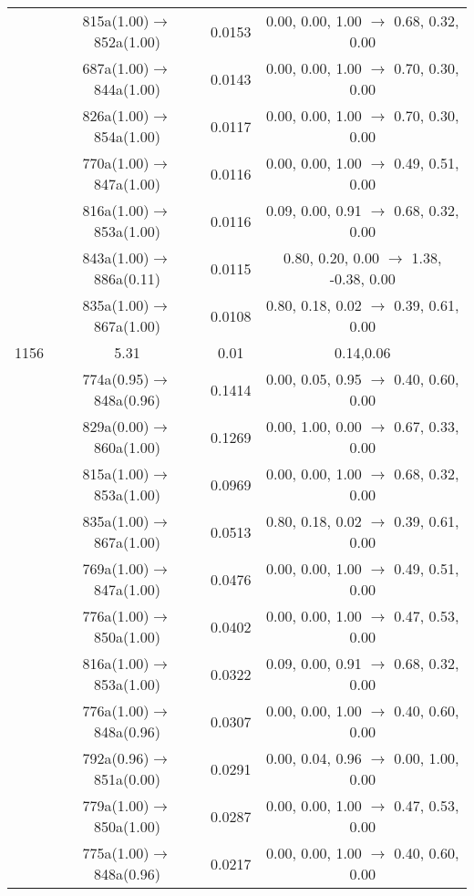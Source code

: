 \documentclass[10pt,a4paper]{article}
\begin{document}
\begin{longtable}{c|c|c|c}
 	& 815a(1.00)$\rightarrow$852a(1.00) &	 0.0153 &	 0.00, 0.00, 1.00 $\rightarrow$ 0.68, 0.32, 0.00 \\ 
 	& 687a(1.00)$\rightarrow$844a(1.00) &	 0.0143 &	 0.00, 0.00, 1.00 $\rightarrow$ 0.70, 0.30, 0.00 \\ 
 	& 826a(1.00)$\rightarrow$854a(1.00) &	 0.0117 &	 0.00, 0.00, 1.00 $\rightarrow$ 0.70, 0.30, 0.00 \\ 
 	& 770a(1.00)$\rightarrow$847a(1.00) &	 0.0116 &	 0.00, 0.00, 1.00 $\rightarrow$ 0.49, 0.51, 0.00 \\ 
 	& 816a(1.00)$\rightarrow$853a(1.00) &	 0.0116 &	 0.09, 0.00, 0.91 $\rightarrow$ 0.68, 0.32, 0.00 \\ 
 	& 843a(1.00)$\rightarrow$886a(0.11) &	 0.0115 &	 0.80, 0.20, 0.00 $\rightarrow$ 1.38, -0.38, 0.00 \\ 
 	& 835a(1.00)$\rightarrow$867a(1.00) &	 0.0108 &	 0.80, 0.18, 0.02 $\rightarrow$ 0.39, 0.61, 0.00 \\ 
 \hline1156 &	 5.31 &	 0.01 &	 0.14,0.06 \\ 
  	& 774a(0.95)$\rightarrow$848a(0.96) &	 0.1414 &	 0.00, 0.05, 0.95 $\rightarrow$ 0.40, 0.60, 0.00 \\ 
 	& 829a(0.00)$\rightarrow$860a(1.00) &	 0.1269 &	 0.00, 1.00, 0.00 $\rightarrow$ 0.67, 0.33, 0.00 \\ 
 	& 815a(1.00)$\rightarrow$853a(1.00) &	 0.0969 &	 0.00, 0.00, 1.00 $\rightarrow$ 0.68, 0.32, 0.00 \\ 
 	& 835a(1.00)$\rightarrow$867a(1.00) &	 0.0513 &	 0.80, 0.18, 0.02 $\rightarrow$ 0.39, 0.61, 0.00 \\ 
 	& 769a(1.00)$\rightarrow$847a(1.00) &	 0.0476 &	 0.00, 0.00, 1.00 $\rightarrow$ 0.49, 0.51, 0.00 \\ 
 	& 776a(1.00)$\rightarrow$850a(1.00) &	 0.0402 &	 0.00, 0.00, 1.00 $\rightarrow$ 0.47, 0.53, 0.00 \\ 
 	& 816a(1.00)$\rightarrow$853a(1.00) &	 0.0322 &	 0.09, 0.00, 0.91 $\rightarrow$ 0.68, 0.32, 0.00 \\ 
 	& 776a(1.00)$\rightarrow$848a(0.96) &	 0.0307 &	 0.00, 0.00, 1.00 $\rightarrow$ 0.40, 0.60, 0.00 \\ 
 	& 792a(0.96)$\rightarrow$851a(0.00) &	 0.0291 &	 0.00, 0.04, 0.96 $\rightarrow$ 0.00, 1.00, 0.00 \\ 
 	& 779a(1.00)$\rightarrow$850a(1.00) &	 0.0287 &	 0.00, 0.00, 1.00 $\rightarrow$ 0.47, 0.53, 0.00 \\ 
 	& 775a(1.00)$\rightarrow$848a(0.96) &	 0.0217 &	 0.00, 0.00, 1.00 $\rightarrow$ 0.40, 0.60, 0.00 \\ 

\end{longtable}
\end{document}
